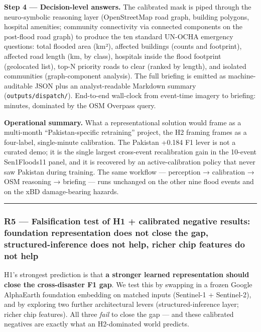 \textbf{Step 4 --- Decision-level answers.} The calibrated mask is piped
through the neuro-symbolic reasoning layer (OpenStreetMap road graph,
building polygons, hospital amenities; community connectivity via
connected components on the post-flood road graph) to produce the ten
standard UN-OCHA emergency questions: total flooded area
(km²), affected buildings (counts and footprint), affected road length
(km, by class), hospitals inside the flood footprint (geolocated list),
top-N priority roads to clear (ranked by length), and isolated
communities (graph-component analysis). The full briefing is emitted
as machine-auditable JSON plus an analyst-readable Markdown summary
(\texttt{outputs/dispatch/}). End-to-end wall-clock from event-time imagery
to briefing: minutes, dominated by the OSM Overpass query.

\textbf{Operational summary.} What a representational solution would frame
as a multi-month ``Pakistan-specific retraining'' project, the H2 framing
frames as a four-label, single-minute calibration. The Pakistan +0.184
F1 lever is not a curated demo; it is the single largest cross-event
recalibration gain in the 10-event Sen1Floods11 panel, and it is
recovered by an active-calibration policy that never saw Pakistan
during training. The same workflow --- perception → calibration → OSM
reasoning → briefing --- runs unchanged on the other nine flood events
and on the xBD damage-bearing hazards.

\begin{center}\rule{0.5\linewidth}{0.5pt}\end{center}

\subsubsection{R5 --- Falsification test of H1 + calibrated negative results: foundation representation does not close the gap, structured-inference does not help, richer chip features do not help}\label{r5-falsification-test-of-h1-calibrated-negative-results-foundation-representation-does-not-close-the-gap-structured-inference-does-not-help-richer-chip-features-do-not-help}

H1's strongest prediction is that \textbf{a stronger learned representation
should close the cross-disaster F1 gap}. We test this by swapping in a
frozen Google AlphaEarth foundation embedding on matched inputs
(Sentinel-1 + Sentinel-2), and by exploring two further architectural
levers (structured-inference layer; richer chip features). All three
\emph{fail} to close the gap --- and these calibrated negatives are exactly
what an H2-dominated world predicts.

